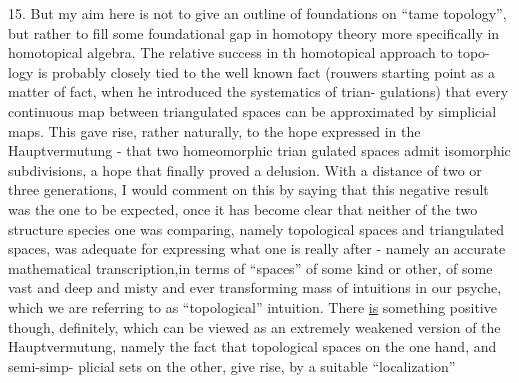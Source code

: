 15.  But my aim here is not to give an outline of foundations  on ``tame
topology'',  but rather to fill some foundational gap in homotopy theory\hand{,}
more specifically in homotopical algebra.
The relative success  in th   homotopical approach to topo-%
logy is probably closely tied to the well known fact (rouwers starting
point as a matter of fact,  when he introduced the systematics of trian-%
gulations)  that every continuous map between triangulated spaces can be
approximated by simplicial maps.  This gave rise,  rather naturally,  to
the hope expressed in the Hauptvermutung  -  that two homeomorphic trian%
gulated spaces admit isomorphic subdivisions,  a hope that finally proved
a delusion.  With a distance of two or three generations,  I would
comment on this by saying that this negative result was the one to be
expected,  once it has become clear that neither of the two structure
species one was comparing,  namely topological spaces and triangulated
spaces,  was adequate for expressing what one is really after  -  namely
an accurate mathematical transcription,in terms of ``spaces'' of some kind
or other, of some vast and deep and misty and ever transforming mass of
intuitions in our psyche,  which we are referring to as ``topological''
\margin{\unsure{$\Pi$}}intuition. There \uline{is}  something positive though,  definitely,  which
can be viewed as an extremely weakened version of the Hauptvermutung,
namely the fact that topological spaces on the one hand,  and semi-simp-%
plicial sets on the other,  give rise,  by a suitable ``localization''
